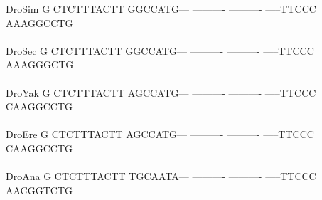 \documentclass[11pt,twoside,reqno,a4paper]{article}
\begin{document}
{DroSim	G	CTCTTTACTT	GGCCATG---	----------	----------	-----TTCCC	AAAGGCCTG\\
\hspace*{7\charwidth}\hspace*{1\charwidth}\hspace*{1\charwidth}\hspace*{1\charwidth}\hspace*{1\charwidth}\hspace*{1\charwidth}\hspace*{1\charwidth}\\
DroSec	G	CTCTTTACTT	GGCCATG---	----------	----------	-----TTCCC	AAAGGGCTG\\
\hspace*{7\charwidth}\hspace*{1\charwidth}\hspace*{1\charwidth}\hspace*{1\charwidth}\hspace*{1\charwidth}\hspace*{1\charwidth}\hspace*{1\charwidth}\\
DroYak	G	CTCTTTACTT	AGCCATG---	----------	----------	-----TTCCC	CAAGGCCTG\\
\hspace*{7\charwidth}\hspace*{1\charwidth}\hspace*{1\charwidth}\hspace*{1\charwidth}\hspace*{1\charwidth}\hspace*{1\charwidth}\hspace*{1\charwidth}\\
DroEre	G	CTCTTTACTT	AGCCATG---	----------	----------	-----TTCCC	CAAGGCCTG\\
\hspace*{7\charwidth}\hspace*{1\charwidth}\hspace*{1\charwidth}\hspace*{1\charwidth}\hspace*{1\charwidth}\hspace*{1\charwidth}\hspace*{1\charwidth}\\
DroAna	G	CTCTTTACTT	TGCAATA---	----------	----------	-----TTCCC	AACGGTCTG\\
\hspace*{7\charwidth}\hspace*{1\charwidth}\hspace*{1\charwidth}\hspace*{1\charwidth}\hspace*{1\charwidth}\hspace*{1\charwidth}\hspace*{1\charwidth}\\
}
\end{document}
